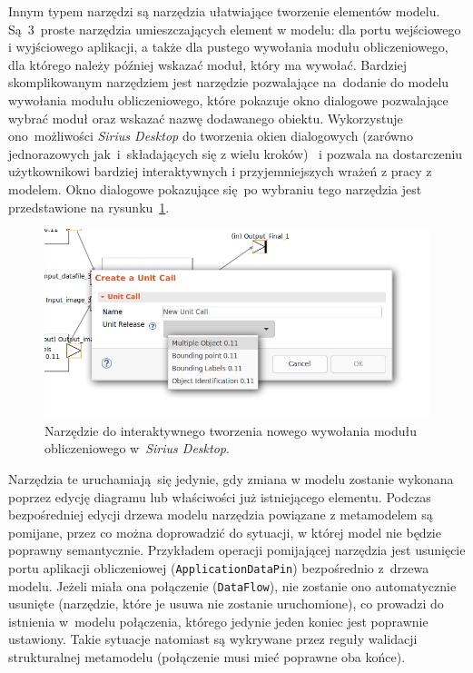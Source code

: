 Innym typem narzędzi są narzędzia ułatwiające tworzenie elementów modelu.
Są~3~proste narzędzia umieszczających element w modelu: dla portu wejściowego i
wyjściowego aplikacji, a także dla pustego wywołania modułu obliczeniowego, dla
którego należy później wskazać moduł, który ma wywołać. Bardziej skomplikowanym
narzędziem jest narzędzie pozwalające na~dodanie do modelu wywołania modułu
obliczeniowego, które pokazuje okno dialogowe pozwalające wybrać moduł oraz
wskazać nazwę dodawanego obiektu. Wykorzystuje ono~możliwości \emph{Sirius
	Desktop} do tworzenia okien dialogowych (zarówno jednorazowych
jak~i~składających się z wielu
kroków)~\cite{sirius-desktop-documentation-tools} i
pozwala na dostarczeniu użytkownikowi
bardziej interaktywnych i przyjemniejszych wrażeń z pracy z modelem. Okno
dialogowe
pokazujące się po wybraniu
tego narzędzia jest przedstawione na
rysunku~\ref{rys:sirius-desktop-create-unit-call-tool}.

\begin{figure}[!hb]
	\centering

	\includegraphics[width=0.95\linewidth]{./images/sirius-desktop-create-unit-call-tool.png}
	\caption{Narzędzie do interaktywnego tworzenia nowego wywołania modułu
		obliczeniowego w~\emph{Sirius Desktop}.}\label{rys:sirius-desktop-create-unit-call-tool}
\end{figure}

Narzędzia te uruchamiają się jedynie, gdy zmiana w modelu zostanie wykonana
poprzez edycję diagramu lub właściwości już istniejącego elementu. Podczas
bezpośredniej edycji drzewa modelu narzędzia powiązane z metamodelem są
pomijane, przez co można doprowadzić do sytuacji, w której model nie będzie
poprawny
semantycznie. Przykładem operacji pomijającej narzędzia jest usunięcie portu
aplikacji obliczeniowej (\texttt{ApplicationDataPin}) bezpośrednio z~drzewa
modelu. Jeżeli miała ona połączenie (\texttt{DataFlow}), nie zostanie ono
automatycznie usunięte (narzędzie, które je usuwa nie zostanie uruchomione), co
prowadzi do istnienia w~modelu połączenia, którego jedynie jeden koniec jest
poprawnie ustawiony. Takie sytuacje natomiast są wykrywane przez reguły
walidacji strukturalnej metamodelu (połączenie musi mieć poprawne oba końce).

